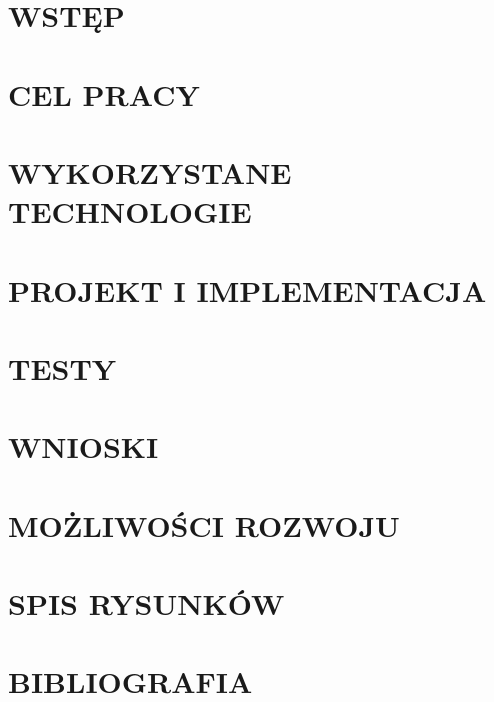 \chapter{WSTĘP}
\chapter{CEL PRACY}
\chapter{WYKORZYSTANE TECHNOLOGIE}
\chapter{PROJEKT I IMPLEMENTACJA}
\chapter{TESTY}
\chapter{WNIOSKI}
\chapter{MOŻLIWOŚCI ROZWOJU}
\chapter{SPIS RYSUNKÓW}
\chapter{BIBLIOGRAFIA}

